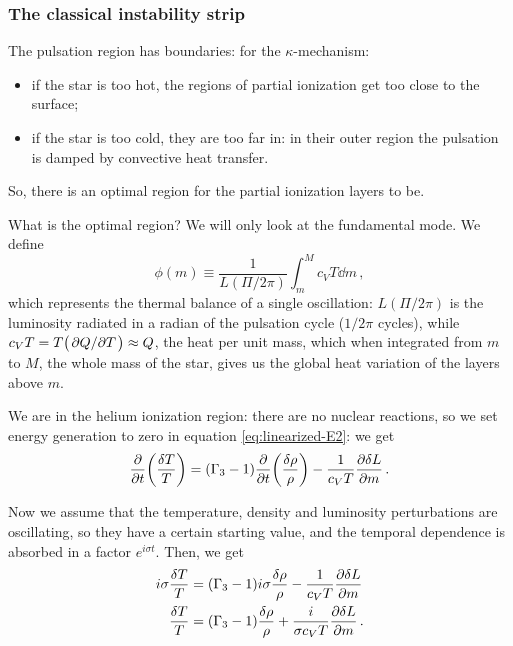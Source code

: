\documentclass[main.tex]{subfiles}
\begin{document}
\subsubsection{The classical instability strip}

The pulsation region has boundaries:
for the \(\kappa \)-mechanism:
\begin{itemize}
    \item if the star is too hot, the regions of partial ionization get too close to the surface;
    \item if the star is too cold, they are too far in: in their outer region the pulsation is damped by convective heat transfer.
\end{itemize}

So, there is an optimal region for the partial ionization layers to be.

What is the optimal region? We will only look  at the fundamental mode. We define
%
\begin{equation}
  \phi (m) \equiv \frac{1}{L(\Pi / 2 \pi )}\int_m^M c_V T \dd{m} 
\,,
\end{equation}
%
which represents the thermal balance of a single oscillation: \(L(\Pi / 2 \pi )\) is the luminosity radiated in a radian of the pulsation cycle (\(1/ 2 \pi \) cycles), 
while \(c_V T = T \qty(\pdv*{Q}{T}) \approx Q\), the heat per unit mass, which when integrated from \(m\) to \(M\), the whole mass of the star, gives us the global heat variation of the layers above \(m\). 

We are in the helium ionization region: there are no nuclear reactions, so we set energy generation to zero in equation \eqref{eq:linearized-E2}: we get 
%
\begin{align}
\pdv{}{t} \qty(\frac{ \delta T}{T}) =
(\Gamma_3 -1) \pdv{}{t} \qty(\frac{ \delta \rho }{\rho })
- \frac{1}{c_V T} \pdv{ \delta L}{m}
\,.
\end{align}

Now we assume that the temperature, density and luminosity perturbations are oscillating, so they have a certain starting value, and the temporal dependence is absorbed in a factor \(e^{i \sigma t}\). Then, we get 
%
\begin{align}
i \sigma \frac{ \delta T}{T} &= (\Gamma_3 -1) i \sigma \frac{ \delta \rho }{\rho } - \frac{1}{c_V T} \pdv{ \delta L}{m} \\
\frac{ \delta T}{T} &= (\Gamma_3 -1) \frac{ \delta \rho }{\rho } + \frac{i}{\sigma  c_V T} \pdv{ \delta L}{m} 
\,.
\end{align}
\end{document}
